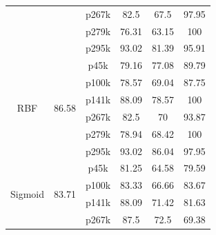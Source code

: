 \begin{table}[h]
{\begin{tabular}{cccccc}
                            &                                                 & p267k                    & 82.5             & 67.5          & 97.95                      \\
                            &                                                 & p279k                    & 76.31            & 63.15         & 100                        \\
                            &                                                 & p295k                    & 93.02            & 81.39         & 95.91                      \\
\hline
\multirow{6}{*}{RBF}        & \multirow{6}{*}{86.58}                          & p45k                     & 79.16            & 77.08         & 89.79                      \\
                            &                                                 & p100k                    & 78.57            & 69.04         & 87.75                      \\
                            &                                                 & p141k                    & 88.09            & 78.57         & 100                        \\
                            &                                                 & p267k                    & 82.5             & 70            & 93.87                      \\
                            &                                                 & p279k                    & 78.94            & 68.42         & 100                        \\
                            &                                                 & p295k                    & 93.02            & 86.04         & 97.95                      \\
\hline
\multirow{6}{*}{Sigmoid}    & \multirow{6}{*}{83.71}                          & p45k                     & 81.25            & 64.58         & 79.59                      \\
                            &                                                 & p100k                    & 83.33            & 66.66         & 83.67                      \\
                            &                                                 & p141k                    & 88.09            & 71.42         & 81.63                      \\
                            &                                                 & p267k                    & 87.5             & 72.5          & 69.38                      \\

\end{tabular}}
\end{table}
